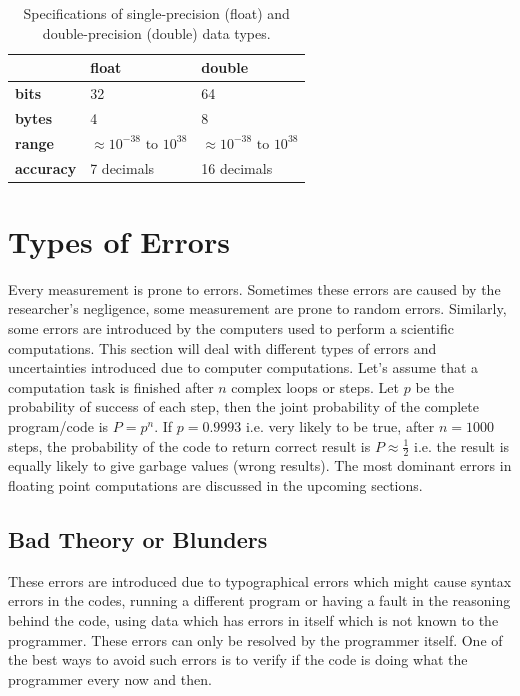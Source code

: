 \documentclass[a4,12pt]{article}
\numberwithin{equation}{subsection}
\begin{document}
\begin{table}[h]
\centering
\begin{tabular}{|l|l|l|}
\hline
         & \textbf{float}                         & \textbf{double}                         \\
         \hline
\textbf{bits}     & 32                                     & 64                                      \\
\textbf{bytes}    & 4                                      & 8                                       \\
\textbf{range}    & $\approx 10^{-38} \text{ to } 10^{38}$ & $ \approx 10^{-38} \text{ to } 10^{38}$ \\
\textbf{accuracy} & 7 decimals                             & 16 decimals \\
\hline                           
\end{tabular}
\caption{Specifications of single-precision (float) and double-precision (double) data types.}
\label{tab:tabel1}
\end{table}

\section{Types of Errors}
Every measurement is prone to errors. Sometimes these errors are caused by the researcher's negligence, some measurement are prone to random errors. Similarly, some errors are introduced by the computers used to perform a scientific computations. This section will deal with different types of errors and uncertainties introduced due to computer computations.
\newline
Let's assume that a computation task is finished after $n$ complex loops or steps. Let $p$ be the probability of success of each step, then the joint probability of the complete program/code is $P=p^{n}$. If $p = 0.9993$ i.e. very likely to be true, after $n=1000$ steps, the probability of the code to return correct result is $P \approx \frac{1}{2}$ i.e. the result is equally likely to give garbage values (wrong results). The most dominant errors in floating point computations are discussed in the upcoming sections.

\subsection{Bad Theory or Blunders}
These errors are introduced due to typographical errors which might cause syntax errors in the codes, running a different program or having a fault in the reasoning behind the code, using data which has errors in itself which is not known to the programmer. These errors can only be resolved by the programmer itself. One of the best ways to avoid such errors is to verify if the code is doing what the programmer every now and then.
\end{document}
